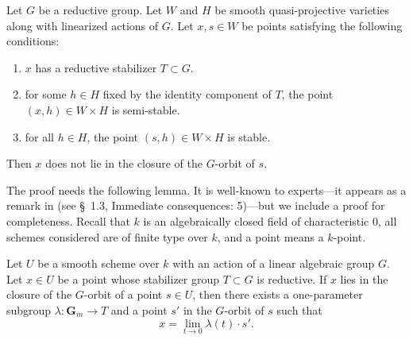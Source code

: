 \documentclass[12pt,reqno]{amsart}
\renewcommand{\k}{k}
\renewcommand{\to}{{\longrightarrow}}
\numberwithin{equation}{section}
\newcommand{\G}{\mathbf G}
\begin{document}
\begin{proposition}\label{prop:gitproduct}
  Let $G$ be a reductive group.
  Let $W$ and $H$ be smooth quasi-projective varieties along with linearized actions of $G$.
  Let $x, s \in W$ be points satisfying the following conditions:
  \begin{enumerate}
  \item $x$ has a reductive stabilizer $T \subset G$.
  \item for some $h \in H$ fixed by the identity component of $T$, the point $(x, h) \in W \times H$ is semi-stable.
  \item for all $h \in H$, the point $(s, h) \in W \times H$ is stable.
  \end{enumerate}
  Then $x$ does not lie in the closure of the $G$-orbit of $s$.
\end{proposition}
The proof needs the following lemma.
It is well-known to experts---it appears as a remark in \cite{alp.hal.ryd:20} (see \S~1.3, Immediate consequences: 5)---but we include a proof for completeness.
Recall that $\k$ is an algebraically closed field of characteristic 0, all schemes considered are of finite type over $\k$, and a point means a $\k$-point.
\begin{lemma}\label{prop:oneparam}
  Let \(U\) be a smooth scheme over $\k$ with an action of a linear algebraic group $G$.
  Let $x \in U$ be a point whose stabilizer group $T \subset G$ is reductive.
  If $x$ lies in the closure of the $G$-orbit of a point $s \in U$, then there exists a one-parameter subgroup $\lambda \colon \G_m \to T$ and a point $s'$ in the $G$-orbit of $s$ such that
  \[ x = \lim_{t \to 0} \lambda(t) \cdot s'.\]
\end{lemma}
\end{document}
